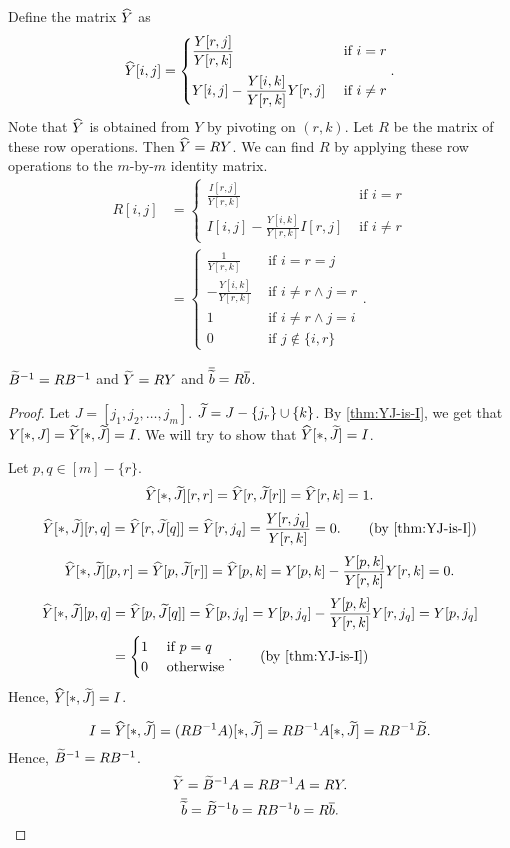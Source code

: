 Define the matrix $\widehat{Y}$ as
\[ \widehat{Y}[i,j] = \begin{cases}
\displaystyle \frac{Y[r,j]}{Y[r,k]} & \textrm{ if } i = r
\\[1em] \displaystyle Y[i,j] - \frac{Y[i,k]}{Y[r,k]}Y[r,j] & \textrm{ if } i \neq r
\end{cases}. \]
Note that $\widehat{Y}$ is obtained from $Y$ by pivoting on $(r, k)$.
Let $R$ be the matrix of these row operations. Then $\widehat{Y} = RY$.
We can find $R$ by applying these row operations to the $m$-by-$m$ identity matrix.
\begin{align*}
R[i,j] &= \begin{cases}
\displaystyle \frac{I[r,j]}{Y[r,k]} & \textrm{ if } i = r
\\[1em] \displaystyle I[i,j] - \frac{Y[i,k]}{Y[r,k]}I[r,j] & \textrm{ if } i \neq r
\end{cases}
\\ &= \begin{cases}
\displaystyle \frac{1}{Y[r,k]} & \textrm{ if } i = r = j
\\[1em] \displaystyle -\frac{Y[i,k]}{Y[r,k]} & \textrm{ if } i \neq r \land j = r
\\ \displaystyle 1 & \textrm{ if } i \neq r \land j = i
\\ \displaystyle 0 & \textrm{ if } j \not\in \{i, r\}
\end{cases}.
\end{align*}

\begin{lemma}
\label{thm:upd-Y}
$\widetilde{B}^{-1} = RB^{-1}$ and $\widetilde{Y} = RY$ and $\overline{\widetilde{b}} = R\overline{b}$.
\end{lemma}
\begin{proof}
Let $J = [j_1, j_2, \ldots, j_m]$. $\widetilde{J} = J - \{j_r\} \cup \{k\}$.
By \cref{thm:YJ-is-I}, we get that $Y[*,J] = \widetilde{Y}[*,\widetilde{J}] = I$.
We will try to show that $\widehat{Y}[*,\widetilde{J}] = I$.

Let $p, q \in [m] - \{r\}$.
\[ \widehat{Y}[*,\widetilde{J}][r,r] = \widehat{Y}[r,\widetilde{J}[r]] = \widehat{Y}[r,k] = 1. \]
\[ \Yhat[*,\Jtild][r,q] = \Yhat[r,\Jtild[q]] = \Yhat[r,j_q] = \frac{Y[r,j_q]}{Y[r,k]} = 0.
    \tag{by \cref{thm:YJ-is-I}} \]
\[ \widehat{Y}[*,\widetilde{J}][p,r] = \widehat{Y}[p,\widetilde{J}[r]] = \widehat{Y}[p,k]
    = Y[p,k] - \frac{Y[p,k]}{Y[r,k]}Y[r,k] = 0. \]
\begin{align*}
\Yhat[*,\Jtild][p,q] &= \Yhat[p,\Jtild[q]] = \Yhat[p,j_q]
= Y[p,j_q] - \frac{Y[p,k]}{Y[r,k]}Y[r,j_q] = Y[p,j_q]
\\ &= \begin{cases}1 & \textrm{ if } p = q \\ 0 & \textrm{ otherwise}\end{cases}.
\tag{by \cref{thm:YJ-is-I}}
\end{align*}
Hence, $\widehat{Y}[*,\widetilde{J}] = I$.

\[ I = \widehat{Y}[*,\widetilde{J}] = (RB^{-1}A)[*,\widetilde{J}] = RB^{-1}A[*,\widetilde{J}] = RB^{-1}\widetilde{B}. \]
Hence, $\widetilde{B}^{-1} = RB^{-1}$.
\[ \widetilde{Y} = \widetilde{B}^{-1}A = RB^{-1}A = RY. \]
\[ \overline{\widetilde{b}} = \widetilde{B}^{-1}b = RB^{-1}b = R\overline{b}. \qedhere \]
\end{proof}

